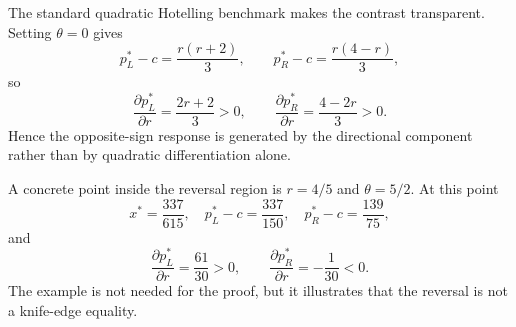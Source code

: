 The standard quadratic Hotelling benchmark makes the contrast transparent. Setting $\theta=0$ gives
\begin{equation}
p_L^*-c=\frac{r(r+2)}{3},
\qquad
p_R^*-c=\frac{r(4-r)}{3},
\end{equation}
so
\begin{equation}
\frac{\partial p_L^*}{\partial r}=\frac{2r+2}{3}>0,
\qquad
\frac{\partial p_R^*}{\partial r}=\frac{4-2r}{3}>0.
\end{equation}
Hence the opposite-sign response is generated by the directional component rather than by quadratic differentiation alone.

A concrete point inside the reversal region is $r=4/5$ and $\theta=5/2$. At this point
\begin{equation}
x^*=\frac{337}{615},\quad
p_L^*-c=\frac{337}{150},\quad
p_R^*-c=\frac{139}{75},
\end{equation}
and
\begin{equation}
\frac{\partial p_L^*}{\partial r}=\frac{61}{30}>0,
\qquad
\frac{\partial p_R^*}{\partial r}=-\frac{1}{30}<0.
\end{equation}
The example is not needed for the proof, but it illustrates that the reversal is not a knife-edge equality.